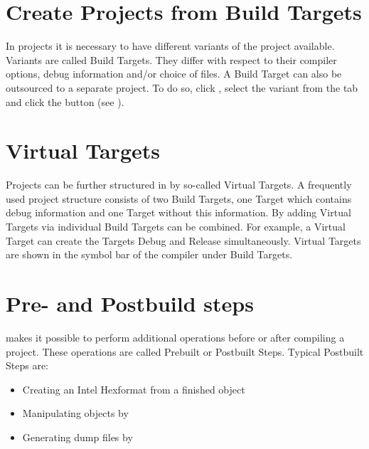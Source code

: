 
\section{Create Projects from Build Targets}

In projects it is necessary to have different variants of the project available. Variants are called Build Targets. They differ with respect to their compiler options, debug information and/or choice of files. A Build Target can also be outsourced to a separate project. To do so, click , select the variant from the tab  and click the  button (see ).


\section{Virtual Targets}

Projects can be further structured in \codeblocks by so-called Virtual Targets. A frequently used project structure consists of two Build Targets, one  Target which contains debug information and one  Target without this information. By adding Virtual Targets via  individual Build Targets can be combined. For example, a Virtual Target  can create the Targets Debug and Release simultaneously. Virtual Targets are shown in the symbol bar of the compiler under Build Targets.

\section{Pre- and Postbuild steps}\label{sec:pre_postbuild}

\codeblocks makes it possible to perform additional operations before or after compiling a project. These operations are called Prebuilt or Postbuilt Steps. Typical Postbuilt Steps are:

\begin{itemize}
\item Creating an Intel Hexformat from a finished object
\item Manipulating objects by 
\item Generating dump files by 
\end{itemize}

